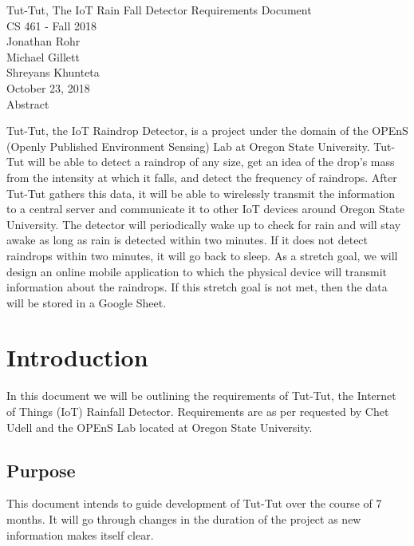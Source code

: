 \documentclass[letterpaper,10pt,draftclsnofoot,onecolumn]{article}
\begin{document}
\begin{titlepage}
\vspace*{\fill}
\begin{center}
{\Large Tut-Tut, The IoT Rain Fall Detector Requirements Document}
\\[0.3cm]

{\large CS 461 - Fall 2018}
\\[0.3cm]

{\large Jonathan Rohr}
\\[0.3cm]

{\large Michael Gillett}
\\[0.3cm]

{\large Shreyans Khunteta}
\\[0.3cm]

{\large October 23, 2018}
\\[1cm]

{\Large Abstract}
\end{center}
Tut-Tut, the IoT Raindrop Detector, is a project under the domain of the OPEnS (Openly Published Environment Sensing) Lab at Oregon State University. Tut-Tut will be able to detect a raindrop of any size, get an idea of the drop's mass from the intensity at which it falls, and detect the frequency of raindrops. After Tut-Tut gathers this data, it will be able to wirelessly transmit the information to a central server and communicate it to other IoT devices around Oregon State University. The detector will periodically wake up to check for rain and will stay awake as long as rain is detected within two minutes. If it does not detect raindrops within two minutes, it will go back to sleep. As a stretch goal, we will design an online mobile application to which the physical device will transmit information about the raindrops. If this stretch goal is not met, then the data will be stored in a Google Sheet.
\vspace*{\fill}
\end{titlepage}

\section{Introduction}
In this document we will be outlining the requirements of Tut-Tut, the Internet of Things (IoT) Rainfall Detector. Requirements are as per requested by Chet Udell and the OPEnS Lab located at Oregon State University.

\subsection{Purpose}
This document intends to guide development of Tut-Tut over the course of 7 months. It will go through changes in the duration of the project as new information makes itself clear.
\end{document}
